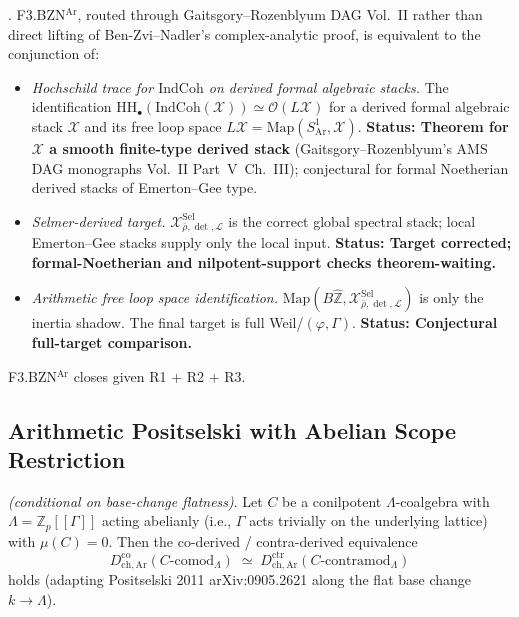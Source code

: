\begin{theorem}
\label{v4-arith:sw:thm:BZN-Ar-split}
\ClaimStatusProvedHere. F3.BZN\(^{\mathrm{Ar}}\), routed through
Gaitsgory--Rozenblyum DAG Vol.~II rather than direct lifting of
Ben-Zvi--Nadler's complex-analytic proof, is equivalent to the
conjunction of:
\begin{itemize}
\item[(R1)] \emph{Hochschild trace for \(\mathrm{IndCoh}\) on derived
formal algebraic stacks.} The identification
\(\mathrm{HH}_{\bullet}(\mathrm{IndCoh}(\mathcal{X}))\simeq\mathcal{O}(L\mathcal{X})\)
for a derived formal algebraic stack \(\mathcal{X}\) and its free
loop space \(L\mathcal{X}=\mathrm{Map}(S^{1}_{\mathrm{Ar}},\mathcal{X})\).
\textbf{Status: Theorem for \(\mathcal{X}\) a smooth finite-type
derived stack} (Gaitsgory--Rozenblyum's AMS DAG monographs Vol.~II
Part~V~Ch.~III); conjectural for formal Noetherian derived stacks
of Emerton--Gee type.
\item[(R2)] \emph{Selmer-derived target.}
\(\mathcal{X}^{\mathrm{Sel}}_{\bar\rho,\det,\mathcal{L}}\) is the
correct global spectral stack; local Emerton--Gee stacks supply only
the local input.
\textbf{Status: Target corrected; formal-Noetherian and
nilpotent-support checks theorem-waiting.}
\item[(R3)] \emph{Arithmetic free loop space identification.}
\(\mathrm{Map}(B\widehat{\mathbb{Z}},\mathcal{X}^{\mathrm{Sel}}_{\bar\rho,\det,\mathcal{L}})\)
is only the inertia shadow. The final target is full
Weil/\((\varphi,\Gamma)\).
\textbf{Status: Conjectural full-target comparison.}
\end{itemize}
F3.BZN\(^{\mathrm{Ar}}\) closes given R1 + R2 + R3.
\end{theorem}

\subsection{Arithmetic Positselski with Abelian Scope Restriction}

\begin{theorem}
\label{v4-arith:sw:thm:PosAr-Heisenberg}
\ClaimStatusProvedHere \emph{(conditional on base-change
flatness)}. Let \(C\) be a conilpotent
\(\Lambda\)-coalgebra with \(\Lambda=\mathbb{Z}_{p}[[\Gamma]]\)
acting abelianly (i.e., \(\Gamma\) acts trivially on the underlying
lattice) with \(\mu(C)=0\). Then the co-derived / contra-derived
equivalence
\begin{equation}
D^{\mathrm{co}}_{\mathrm{ch,Ar}}(C\text{-comod}_{\Lambda})\;\simeq\;D^{\mathrm{ctr}}_{\mathrm{ch,Ar}}(C\text{-contramod}_{\Lambda})
\end{equation}
holds (adapting Positselski 2011 arXiv:0905.2621 along the flat
base change \(k\to\Lambda\)).
\end{theorem}

